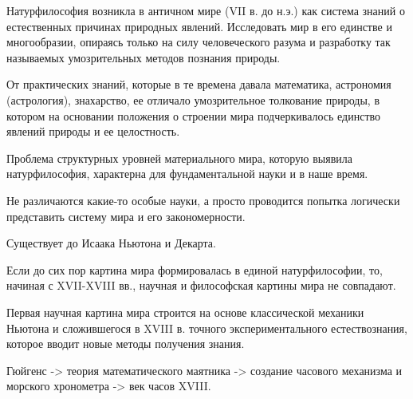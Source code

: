 \documentclass[exam_answers.tex]{subfiles}
\begin{document}
\renewcommand{\baselinestretch}{\blch}

Натурфилософия возникла в античном мире (VII в. до н.э.) как система знаний о естественных причинах природных явлений.
Исследовать мир в его единстве и многообразии, опираясь только на силу человеческого разума и разработку так называемых умозрительных методов познания природы.

От практических знаний, которые в те времена давала математика,
астрономия (астрология), знахарство, ее отличало умозрительное
толкование природы, в котором на основании положения о строении
мира подчеркивалось единство явлений природы и ее целостность.

Проблема структурных уровней материального мира, которую выявила
натурфилософия, характерна для фундаментальной науки и в наше
время.

Не различаются какие-то особые науки, а просто проводится попытка логически представить систему мира и его закономерности.

Существует до Исаака Ньютона и Декарта.

Если до сих пор картина мира формировалась в единой натурфилософии, то,
начиная с XVII-XVIII вв., научная и философская картины мира не совпадают.

Первая научная картина мира строится на основе классической
механики Ньютона и сложившегося в XVIII в. точного
экспериментального естествознания, которое вводит новые методы
получения знания.

Гюйгенс -> теория математического маятника -> создание часового механизма и морского хронометра -> век часов XVIII.
\end{document}
